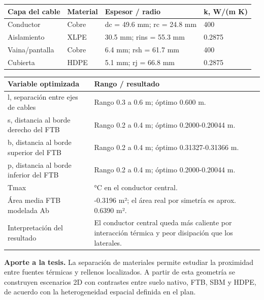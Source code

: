 \documentclass[11pt,a4paper,oneside]{report}
\newcounter{none}
\begin{document}
{\def\LTcaptype{none} %
\begin{longtable}[]{@{}llll@{}}
\toprule\noalign{}
Capa del cable & Material & Espesor / radio & k, W/(m K) \\
\midrule\noalign{}
\endhead
\bottomrule\noalign{}
\endlastfoot
Conductor & Cobre & dc = 49.6 mm; rc = 24.8 mm & 400 \\
Aislamiento & XLPE & 30.5 mm; rins = 55.3 mm & 0.2875 \\
Vaina/pantalla & Cobre & 6.4 mm; rsh = 61.7 mm & 400 \\
Cubierta & HDPE & 5.1 mm; rj = 66.8 mm & 0.2875 \\
\end{longtable}
}

{\def\LTcaptype{none} %
\begin{longtable}[]{@{}
  >{\raggedright\arraybackslash}p{}
  >{\raggedright\arraybackslash}p{}@{}}
\toprule\noalign{}
\begin{minipage}[b]{\linewidth}\raggedright
Variable optimizada
\end{minipage} & \begin{minipage}[b]{\linewidth}\raggedright
Rango / resultado
\end{minipage} \\
\midrule\noalign{}
\endhead
\bottomrule\noalign{}
\endlastfoot
l, separación entre ejes de cables & Rango 0.3 a 0.6 m; óptimo 0.600
m. \\
s, distancia al borde derecho del FTB & Rango 0.2 a 0.4 m; óptimo
0.2000-0.20044 m. \\
b, distancia al borde superior del FTB & Rango 0.2 a 0.4 m; óptimo
0.31327-0.31366 m. \\
p, distancia al borde inferior del FTB & Rango 0.2 a 0.4 m; óptimo
0.2000-0.20044 m. \\
Tmax & 65 °C en el conductor central. \\
Área media FTB modelada Ab & 0.3195-0.3196 m²; el área real por simetría
es aprox. 0.6390 m². \\
Interpretación del resultado & El conductor central queda más caliente
por interacción térmica y peor disipación que los laterales. \\
\end{longtable}
}

\textbf{Aporte a la tesis.} La separación de materiales permite estudiar
la proximidad entre fuentes térmicas y rellenos localizados. A partir de
esta geometría se construyen escenarios 2D con contrastes entre suelo
nativo, FTB, SBM y HDPE, de acuerdo con la heterogeneidad espacial
definida en el plan.
\end{document}
